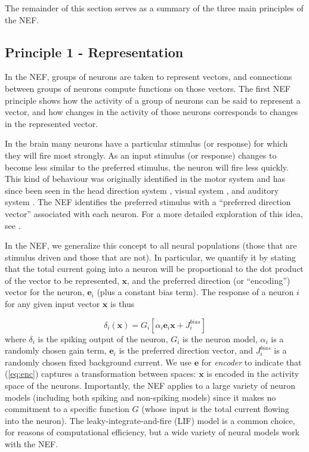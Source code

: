 \documentclass[english]{article}
\begin{document}
The remainder of this section serves as a summary of the three main principles
of the NEF. 

\subsection{Principle 1 - Representation}

In the NEF, groups of neurons are taken to represent vectors,
and connections between groups of neurons compute functions on those
vectors. The first NEF principle shows how the activity of a group
of neurons can be said to represent a vector, and how changes in the
activity of those neurons corresponds to changes in the represented
vector.

In the brain many neurons have a particular stimulus (or response) for
which they will fire most strongly. As an input stimulus (or response)
changes to become less similar to the preferred stimulus, the neuron
will fire less quickly.  This kind of behaviour was originally identified in the motor
system \cite{Georgopoulos1989q} and has since been seen in the head
direction system \cite{Taube2007}, visual system \cite{Rust2006},
and auditory system \cite{Fischer2009w}. The NEF identifies the preferred stimulus with a ``preferred direction vector'' associated with each neuron.  For a more detailed exploration of this idea, see \cite{Stewart2011a}.

In the NEF, we generalize this concept to all neural populations (those that are stimulus driven and those that are not).
In particular, we quantify it by stating that the total current going
into a neuron will be proportional to the dot product of the vector
to be represented, $\mathbf{x}$, and the preferred direction (or ``encoding'') vector
for the neuron, $\mathbf{e}_{i}$ (plus a constant bias term). The
response of a neuron \textbf{$i$} for any given input vector \textbf{$\mathbf{x}$}
is thus

\begin{equation}
\delta_{i}(\mathbf{x})=G_{i}[\alpha_{i}\mathbf{e}_{i}\mathbf{x}+J_{i}^{bias}]\label{eq:enc}
\end{equation}
where $\delta_{i}$ is the spiking output of the neuron, $G_{i}$
is the neuron model, $\alpha_{i}$ is a randomly chosen gain term,
$\mathbf{e}_{i}$ is the preferred direction vector, and $J_{i}^{bias}$
is a randomly chosen fixed background current. We use $\mathbf{e}$
for \textit{encoder} to indicate that (\ref{eq:enc}) captures a transformation
between spaces: \textbf{$\mathbf{x}$} is encoded in the activity
space of the neurons.  Importantly, the NEF applies
to a large variety of neuron models (including both spiking and non-spiking
models) since it makes no commitment to a specific function $G$ (whose
input is the total current flowing into the neuron). The leaky-integrate-and-fire
(LIF) model is a common choice, for reasons of computational efficiency, but a wide variety of
neural models work with the NEF. 
\end{document}
